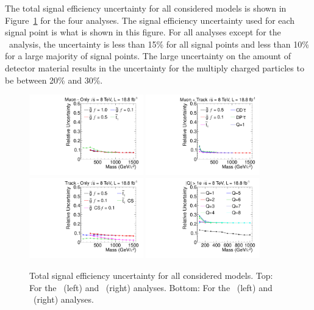 The total signal efficiency uncertainty for all considered models is shown in
Figure~\ref{fig:TotalUnc} for the four analyses. The signal efficiency uncertainty used for each signal point is what is shown in this figure.
For all analyses except for the \multi\ analysis, the uncertainty is less than 15\% for all signal points and less than 10\% for a large majority of signal points.
The large uncertainty on the amount of detector material results in the uncertainty for the multiply charged particles to be between 20\% and 30\%.

\begin{figure}[ht]
\centering
  \includegraphics[clip=true, trim=0.0cm 0cm 2.8cm 0cm, width=0.44\textwidth]{figures/muonly/MOUncertainty}
  \includegraphics[clip=true, trim=0.0cm 0cm 2.8cm 0cm, width=0.44\textwidth]{figures/tkmu/MuUncertainty}
  \includegraphics[clip=true, trim=0.0cm 0cm 2.8cm 0cm, width=0.44\textwidth]{figures/tkonly/TkUncertainty}
  \includegraphics[clip=true, trim=0.0cm 0cm 2.8cm 0cm, width=0.44\textwidth]{figures/multi/HQUncertainty}
\caption[Total signal efficiency uncertainty for all considered models]
{Total signal efficiency uncertainty for all considered models.
Top:  For the \muononly\ (left) and \tktof\ (right) analyses.
Bottom:  For the \tkonly\ (left) and \multi\ (right) analyses.}
    \label{fig:TotalUnc}
\end{figure}

